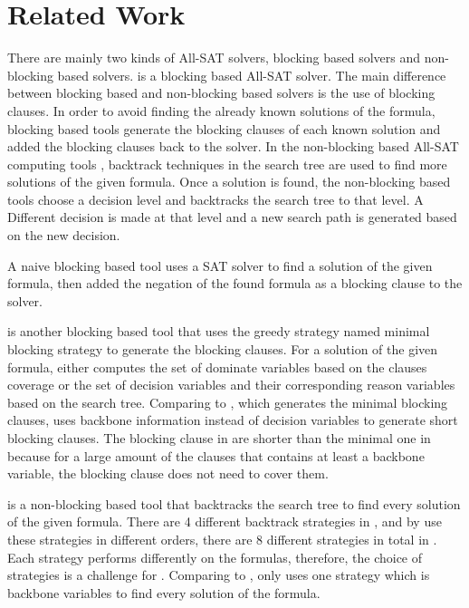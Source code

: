 \section{Related Work} \label{sec:rela}
There are mainly two kinds of All-SAT solvers, blocking based solvers and non-blocking based solvers.
\tool is a blocking based All-SAT solver.
The main difference between blocking based and non-blocking based solvers is the use of blocking clauses.
In order to avoid finding the already known solutions of the formula, blocking based tools generate the blocking clauses of each known solution and added the blocking clauses back to the solver.
In the non-blocking based All-SAT computing tools \cite{zhao2009asig} \cite{grumberg2004memory} \cite{jabbour2014extending} \cite{ietool}, backtrack techniques in the search tree are used to find more solutions of the given formula. Once a solution is found, the non-blocking based tools choose a decision level and backtracks the search tree to that level. A Different decision is made at that level and a new search path is generated based on the new decision.

A naive blocking based tool \cite{mcmillan2002applying} uses a SAT solver to find a solution of the given formula, then added the negation of the found formula as a blocking clause to the solver.

\ctool\cite{ietool} is another blocking based tool that uses the greedy strategy named minimal blocking strategy to generate the blocking clauses.
For a solution of the given formula, \ctool either computes the set of dominate variables based on the clauses coverage or the set of decision variables and their corresponding reason variables based on the search tree.
Comparing to \ctool, which generates the minimal blocking clauses, \tool uses backbone information instead of decision variables to generate short blocking clauses. The blocking clause in \tool are shorter than the minimal one in \ctool because for a large amount of the clauses that contains at least a backbone variable, the blocking clause does not need to cover them.

\nbc\cite{ietool} is a non-blocking based tool that backtracks the search tree to find every solution of the given formula. There are 4 different backtrack strategies in \nbc, and by use these strategies in different orders, there are 8 different strategies in total in \nbc. Each strategy performs differently on the formulas, therefore, the choice of strategies is a challenge for \nbc. 
Comparing to \nbc, \tool only uses one strategy which is backbone variables to find every solution of the formula.

